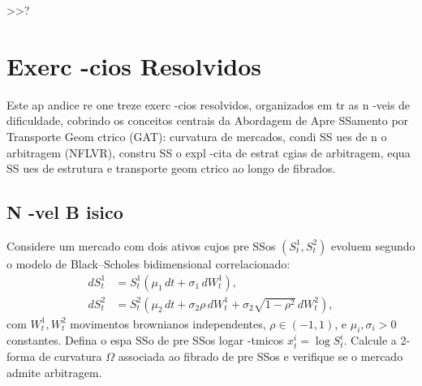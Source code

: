  >>?\chapter{Exerc -cios Resolvidos}
\label{apx:exers}

Este ap andice re one treze exerc -cios resolvidos, organizados em tr as n -veis de dificuldade, cobrindo os conceitos centrais da Abordagem de Apre SSamento por Transporte Geom ctrico (GAT): curvatura de mercados, condi SS ues de n o arbitragem (NFLVR), constru SS o expl -cita de estrat cgias de arbitragem, equa SS ues de estrutura e transporte geom ctrico ao longo de fibrados.

\section{N -vel B isico}
\label{sec:ex_basico}

\begin{exer}
\label{ex:curvatura_2ativos}
Considere um mercado com dois ativos cujos pre SSos $(S^1_t, S^2_t)$ evoluem segundo o modelo de Black--Scholes bidimensional correlacionado:
\begin{align*}
 dS^1_t &= S^1_t(\mu_1\,dt + \sigma_1\,dW^1_t), \\
 dS^2_t &= S^2_t(\mu_2\,dt + \sigma_2\rho\,dW^1_t + \sigma_2\sqrt{1-\rho^2}\,dW^2_t),
\end{align*}
com $W^1_t, W^2_t$ movimentos brownianos independentes, $\rho\in(-1,1)$, e $\mu_i,\sigma_i>0$ constantes. Defina o espa SSo de pre SSos logar -tmicos $x^i_t = \log S^i_t$. Calcule a 2-forma de curvatura $\Omega$ associada ao fibrado de pre SSos e verifique se o mercado admite arbitragem.
\end{exer}

